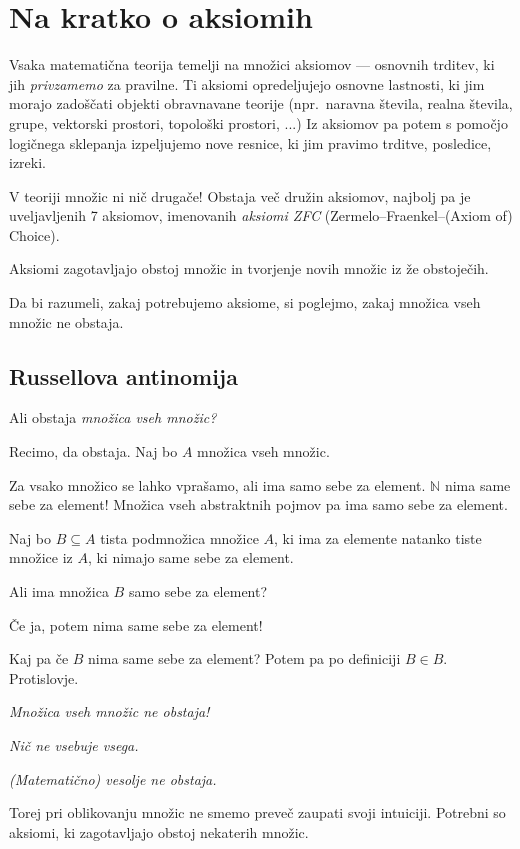 \documentclass[11pt,paper=b5,DIV=13,headinclude,footinclude]{scrbook}
\begin{document}
\section{Na kratko o aksiomih}

Vsaka matematična teorija temelji na množici aksiomov --- osnovnih trditev, ki jih {\em privzamemo} za pravilne. Ti aksiomi opredeljujejo osnovne lastnosti, ki jim morajo zadoščati objekti obravnavane teorije (npr.~naravna števila, realna števila, grupe, vektorski prostori, topološki prostori, ...) Iz aksiomov pa potem s pomočjo logičnega sklepanja izpeljujemo nove resnice, ki jim pravimo trditve, posledice, izreki.

V teoriji množic ni nič drugače! Obstaja več družin aksiomov, najbolj pa je uveljavljenih 7 aksiomov, imenovanih {\em aksiomi ZFC} (Zermelo--Fraenkel--(Axiom of) Choice).

Aksiomi zagotavljajo obstoj množic in tvorjenje novih množic iz že obstoječih.

Da bi razumeli, zakaj potrebujemo aksiome, si poglejmo, zakaj množica vseh
množic ne obstaja.

\subsection{Russellova antinomija}

Ali obstaja {\em množica vseh množic?}

Recimo, da obstaja. Naj bo $A$ množica vseh množic.

Za vsako množico se lahko vprašamo, ali ima samo sebe za element. $\mathbb{N}$ nima same sebe za element! Množica vseh abstraktnih pojmov pa ima samo sebe za element.

Naj bo $B\subseteq A$ tista podmnožica množice $A$, ki ima za elemente natanko tiste množice iz $A$, ki nimajo same sebe za element.

Ali ima množica $B$ samo sebe za element?

Če ja, potem nima same sebe za element!

Kaj pa če $B$ nima same sebe za element? Potem pa po definiciji $B\in B$.
Protislovje.

{\em Množica vseh množic ne obstaja!}

{\centerline\em Nič ne vsebuje vsega.} \textit{(Matematično) vesolje ne obstaja.}

\medskip
Torej pri oblikovanju množic ne smemo preveč zaupati svoji intuiciji. Potrebni so aksiomi, ki zagotavljajo obstoj nekaterih množic.
\end{document}
